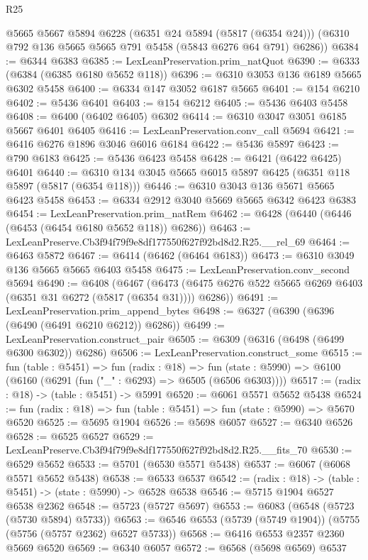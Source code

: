 \begin{lexlean}{R25}
\begin{coremodule}
      @5665
      @5667
      @5894
      @6228
      (@6351 @24 @5894 (@5817 (@6354 @24)))
      (@6310 @792 @136 @5665 @5665 @791 @5458 (@5843 @6276 @64 @791) @6286))
@6384 := @6344 @6383
@6385 := LexLeanPreservation.prim_natQuot
@6390 := @6333 (@6384 (@6385 @6180 @5652 @118))
@6396 := @6310 @3053 @136 @6189 @5665 @6302 @5458
@6400 := @6334 @147 @3052 @6187 @5665
@6401 := @154 @6210
@6402 := @5436 @6401
@6403 := @154 @6212
@6405 := @5436 @6403 @5458
@6408 := @6400 (@6402 @6405) @6302
@6414 := @6310 @3047 @3051 @6185 @5667 @6401 @6405
@6416 := LexLeanPreservation.conv_call @5694
@6421 := @6416 @6276 @1896 @3046 @6016 @6184
@6422 := @5436 @5897
@6423 := @790 @6183
@6425 := @5436 @6423 @5458
@6428 := @6421 (@6422 @6425) @6401
@6440 := @6310 @134 @3045 @5665 @6015 @5897 @6425 (@6351 @118 @5897 (@5817 (@6354 @118)))
@6446 := @6310 @3043 @136 @5671 @5665 @6423 @5458
@6453 := @6334 @2912 @3040 @5669 @5665 @6342 @6423 @6383
@6454 := LexLeanPreservation.prim_natRem
@6462 := @6428 (@6440 (@6446 (@6453 (@6454 @6180 @5652 @118)) @6286))
@6463 := LexLeanPreserve.Cb3f94f79f9e8df177550f627f92bd8d2.R25.__rel_69
@6464 := @6463 @5872
@6467 := @6414 (@6462 (@6464 @6183))
@6473 := @6310 @3049 @136 @5665 @5665 @6403 @5458
@6475 := LexLeanPreservation.conv_second @5694
@6490 := @6408
    (@6467 (@6473 (@6475 @6276 @522 @5665 @6269 @6403 (@6351 @31 @6272 (@5817 (@6354 @31)))) @6286))
@6491 := LexLeanPreservation.prim_append_bytes
@6498 := @6327 (@6390 (@6396 (@6490 (@6491 @6210 @6212)) @6286))
@6499 := LexLeanPreservation.construct_pair
@6505 := @6309 (@6316 (@6498 (@6499 @6300 @6302)) @6286)
@6506 := LexLeanPreservation.construct_some
@6515 := fun (table : @5451) =>
  fun (radix : @18) =>
  fun (state : @5990) => @6100 (@6160 (@6291 (fun ("_" : @6293) => @6505 (@6506 @6303))))
@6517 := (radix : @18) -> (table : @5451) -> @5991
@6520 := @6061 @5571 @5652 @5438
@6524 := fun (radix : @18) => fun (table : @5451) => fun (state : @5990) => @5670 @6520
@6525 := @5695 @1904
@6526 := @5698 @6057
@6527 := @6340 @6526
@6528 := @6525 @6527
@6529 := LexLeanPreserve.Cb3f94f79f9e8df177550f627f92bd8d2.R25.__fits_70
@6530 := @6529 @5652
@6533 := @5701 (@6530 @5571 @5438)
@6537 := @6067 (@6068 @5571 @5652 @5438)
@6538 := @6533 @6537
@6542 := (radix : @18) -> (table : @5451) -> (state : @5990) -> @6528 @6538
@6546 := @5715 @1904 @6527 @6538 @2362
@6548 := @5723 (@5727 @5697)
@6553 := @6083 (@6548 (@5723 (@5730 @5894) @5733))
@6563 := @6546 @6553 (@5739 (@5749 @1904)) (@5755 (@5756 (@5757 @2362) @6527 @5733))
@6568 := @6416 @6553 @2357 @2360 @5669 @6520
@6569 := @6340 @6057
@6572 := @6568 (@5698 @6569) @6537

\end{coremodule}
\end{lexlean}
